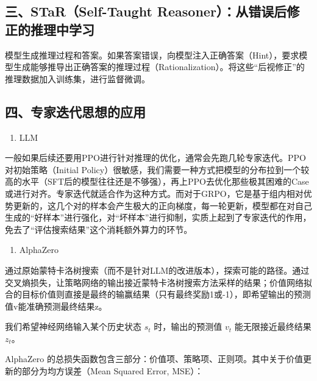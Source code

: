 \hypertarget{ux4e09starself-taught-reasonerux4eceux9519ux8befux540eux4feeux6b63ux7684ux63a8ux7406ux4e2dux5b66ux4e60}{%
\subsection{三、STaR（Self-Taught Reasoner）：从错误后修正的推理中学习}\label{ux4e09starself-taught-reasonerux4eceux9519ux8befux540eux4feeux6b63ux7684ux63a8ux7406ux4e2dux5b66ux4e60}}

模型生成推理过程和答案。如果答案错误，向模型注入正确答案（Hint），要求模型生成能够推导出正确答案的推理过程（Rationalization）。将这些``后视修正''的推理数据加入训练集，进行监督微调。

\hypertarget{ux56dbux4e13ux5bb6ux8fedux4ee3ux601dux60f3ux7684ux5e94ux7528}{%
\subsection{四、专家迭代思想的应用}\label{ux56dbux4e13ux5bb6ux8fedux4ee3ux601dux60f3ux7684ux5e94ux7528}}

\begin{enumerate}
\def\labelenumi{\arabic{enumi}.}
\tightlist
\item
  LLM
\end{enumerate}

一般如果后续还要用PPO进行针对推理的优化，通常会先跑几轮专家迭代。PPO对初始策略（Initial Policy）很敏感，我们需要一种方式把模型的分布拉到一个较高的水平（SFT后的模型往往还是不够强），再上PPO去优化那些极其困难的Case或进行对齐。专家迭代就适合作为这种方式。而对于GRPO，它是基于组内相对优势更新的，这几个对的样本会产生极大的正向梯度，每一轮更新，模型都在对自己生成的``好样本''进行强化，对``坏样本''进行抑制，实质上起到了专家迭代的作用，免去了``评估搜索结果''这个消耗额外算力的环节。

\begin{enumerate}
\def\labelenumi{\arabic{enumi}.}
\setcounter{enumi}{1}
\tightlist
\item
  AlphaZero
\end{enumerate}

通过原始蒙特卡洛树搜索（而不是针对LLM的改进版本），探索可能的路径。通过交叉熵损失，让策略网络的输出接近蒙特卡洛树搜索方法采样的结果；价值网络拟合的目标价值则直接是最终的输赢结果（只有最终奖励1或-1），即希望输出的预测值v能准确预测最终结果z。

我们希望神经网络输入某个历史状态 \(s_t\) 时，输出的预测值 \(v_t\) 能无限接近最终结果 \(z_t\)。

AlphaZero 的总损失函数包含三部分：价值项、策略项、正则项。其中关于价值更新的部分为均方误差（Mean Squared Error, MSE）：

